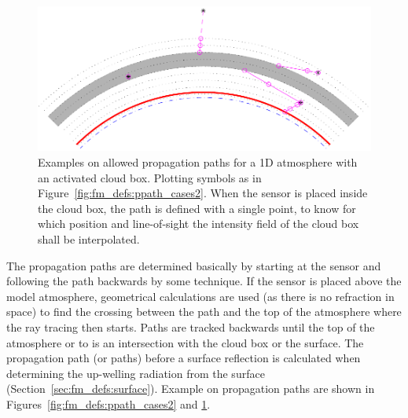 \begin{figure}[p]
 \begin{center}
  \includegraphics*[width=0.99\hsize]{ppath_cases1}
  \caption{Examples on allowed propagation paths for a 1D atmosphere
    with an activated cloud box. Plotting symbols as in
    Figure~\ref{fig:fm_defs:ppath_cases2}. When the sensor is placed 
    inside the cloud box, the path is defined with a single point, 
    to know for which position and line-of-sight the intensity field of
    the cloud box shall be interpolated. }
  \label{fig:fm_defs:ppath_cases1}
 \end{center}
\end{figure}



The propagation paths are determined basically by starting at the
sensor and following the path backwards by some  technique. If the sensor is placed above the model
atmosphere, geometrical calculations are used (as there is no
refraction in space) to find the crossing between the path and the top
of the atmosphere where the ray tracing then starts. Paths are tracked
backwards until the top of the atmosphere or to is an
intersection with the cloud box or the surface. The propagation path
(or paths) before a surface reflection is calculated when determining
the up-welling radiation from the surface
(Section~\ref{sec:fm_defs:surface}). Example on propagation
paths are shown in Figures~\ref{fig:fm_defs:ppath_cases2} and 
\ref{fig:fm_defs:ppath_cases1}.
 
